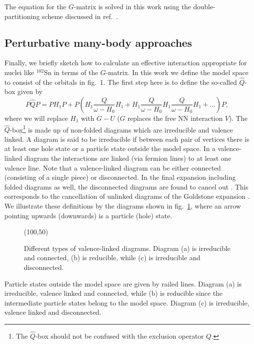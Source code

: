 The equation for the $G$-matrix is solved in this work using the
double-partitioning scheme discussed in ref.\ \cite{kkko76}. 

\subsection{Perturbative many-body approaches}

Finally, we briefly sketch how to calculate an effective interaction
appropriate for nuclei like $^{102}$Sn in terms of the $G$-matrix. 
In this work we define the model space to consist of
the orbitals in fig.\ 1.
The first step here is to define the so-called $\hat{Q}$-box given by
\begin{equation}
   P\hat{Q}P=PH_1P+
   P\left(H_1 \frac{Q}{\omega-H_{0}}H_1+H_1
   \frac{Q}{\omega-H_{0}}H_1 \frac{Q}{\omega-H_{0}}H_1 +\dots\right)P,
   \label{eq:qbox}
\end{equation}
where we will replace $H_1$ with $G-U$ ($G$ replaces the free NN interaction
$V$).
The $\hat{Q}$-box\footnote{The $\hat{Q}$-box should not be confused
with the exclusion operator $Q$.} 
is made up of non-folded diagrams which are irreducible
and valence linked. A diagram is said to be irreducible if between each pair
of vertices there is at least one hole state or a particle state outside
the model space. In a valence-linked diagram the interactions are linked
(via fermion lines) to at least one valence line. Note that a valence-linked
diagram can be either connected (consisting of a single piece) or
disconnected. In the final expansion including folded diagrams as well, the
disconnected diagrams are found to cancel out \cite{ko90}. 
This corresponds to the cancellation of unlinked diagrams
of the Goldstone expansion \cite{ko90}.
We illustrate
these definitions by the diagrams shown in fig.\ 
\ref{fig:diagsexam}, where an arrow pointing upwards
(downwards) is a particle (hole) state.
\begin{figure}[hbtp]
   \setlength{\unitlength}{1mm}
   \begin{picture}(100,50)
   \end{picture}
\caption{Different types of valence-linked diagrams. Diagram (a)
is irreducible and connected, (b) is reducible, while (c) is irreducible
and disconnected.}
\label{fig:diagsexam}
\end{figure}
Particle states outside the model space are given by railed lines. 
Diagram (a) is irreducible, valence linked and connected, 
while (b) is reducible since 
the intermediate particle states belong to the model space. 
Diagram (c) is irreducible, valence linked and disconnected. 

